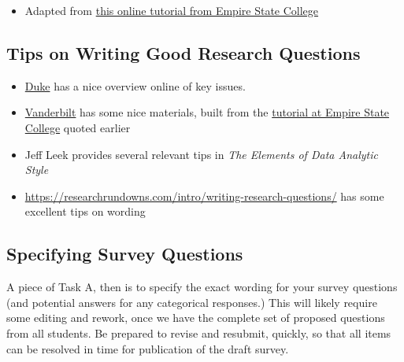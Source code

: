 \documentclass[]{book}
\providecommand{\tightlist}{%
  \setlength{\itemsep}{0pt}\setlength{\parskip}{0pt}}
\theoremstyle{definition}
\theoremstyle{definition}
\theoremstyle{definition}
\theoremstyle{remark}
\begin{document}
\begin{itemize}
\tightlist
\item
  Adapted from
  \href{http://www8.esc.edu/htmlpages/writerold/menus.htm\#develop}{this
  online tutorial from Empire State College}
\end{itemize}

\hypertarget{tips-on-writing-good-research-questions}{%
\subsection{Tips on Writing Good Research
Questions}\label{tips-on-writing-good-research-questions}}

\begin{itemize}
\tightlist
\item
  \href{http://twp.duke.edu/uploads/media_items/research-questions.original.pdf}{Duke}
  has a nice overview online of key issues.
\item
  \href{http://vanderbilt.edu/writing/manage/wp-content/uploads/2013/06/Formulating\%20Your\%20Research\%20Question.pdf}{Vanderbilt}
  has some nice materials, built from the
  \href{http://www8.esc.edu/htmlpages/writerold/menus.htm\#develop}{tutorial
  at Empire State College} quoted earlier
\item
  Jeff Leek provides several relevant tips in \emph{The Elements of Data
  Analytic Style}
\item
  \url{https://researchrundowns.com/intro/writing-research-questions/}
  has some excellent tips on wording
\end{itemize}

\hypertarget{specifying-survey-questions}{%
\subsection{Specifying Survey
Questions}\label{specifying-survey-questions}}

A piece of Task A, then is to specify the exact wording for your survey
questions (and potential answers for any categorical responses.) This
will likely require some editing and rework, once we have the complete
set of proposed questions from all students. Be prepared to revise and
resubmit, quickly, so that all items can be resolved in time for
publication of the draft survey.
\end{document}
